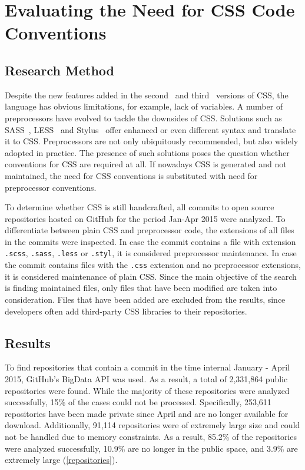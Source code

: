 \chapter{Evaluating the Need for CSS Code Conventions}
\label{sec:evaluating}

\section{Research Method}

Despite the new features added in the second~\cite{CSS2} and third~\cite{CSS3}
versions of CSS, the language has obvious limitations, for example, lack of
variables. A number of preprocessors have evolved to tackle the downsides of
CSS. Solutions such as SASS~\cite{SASS}, LESS~\cite{LESS} and
Stylus~\cite{Stylus} offer enhanced or even different syntax and translate it
to CSS. Preprocessors are not only ubiquitously recommended, but also widely
adopted in practice. The presence of such solutions poses the question whether
conventions for CSS are required at all. If nowadays CSS is generated and not
maintained, the need for CSS conventions is substituted with need for
preprocessor conventions.

To determine whether CSS is still handcrafted, all commits to open source
repositories hosted on GitHub for the period Jan-Apr 2015 were analyzed. To
differentiate between plain CSS and preprocessor code, the extensions of all
files in the commits were inspected. In case the commit contains a file with
extension \texttt{.scss}, \texttt{.sass}, \texttt{.less} or \texttt{.styl}, it
is considered preprocessor maintenance. In case the commit contains files with
the \texttt{.css} extension and no preprocessor extensions, it is considered
maintenance of plain CSS. Since the main objective of the search is finding
maintained files, only files that have been modified are taken into
consideration. Files that have been added are excluded from the results, since
developers often add third-party CSS libraries to their repositories.


\section{Results}

To find repositories that contain a commit in the time internal January -
April 2015, GitHub's BigData API was used. As a result, a total of 2,331,864
public repositories were found. While the majority of these repositories were
analyzed successfully, 15\% of the cases could not be processed.
Specifically, 253,611 repositories have been made private since April and
are no longer available for download. Additionally, 91,114 repositories were
of extremely large size and could not be handled due to memory constraints. As a
result, 85.2\% of the repositories were analyzed successfully, 10.9\% are no
longer in the public space, and 3.9\% are extremely large
(\autoref{repositories}).

